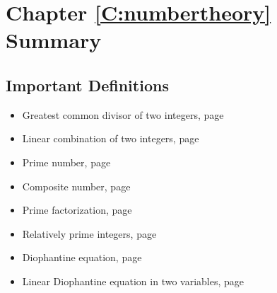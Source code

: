 \section{Chapter \ref{C:numbertheory} Summary}


\subsection*{Important Definitions}
\begin{itemize}
\item Greatest common divisor of two integers, page~\pageref*{gcd}
\item Linear combination of two integers, page~\pageref*{linearcombination}
\item Prime number, page~\pageref*{def:prime}
\item Composite number, page~\pageref*{def:prime}
\item Prime factorization, page~\pageref*{def:primefactorization}
\item Relatively prime integers, page~\pageref*{relativelyprime}
\item Diophantine equation, page~\pageref*{diophantineequation}
\item Linear Diophantine equation in two variables, page~\pageref*{lineardiophantine}
\end{itemize}



